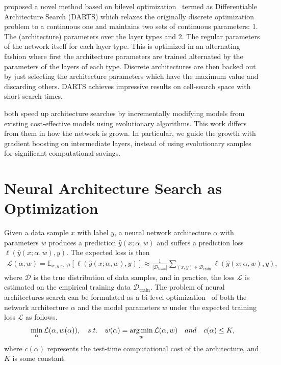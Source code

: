 \cite{Liu2018DARTSDA} proposed a novel method based on bilevel
optimization~\citep{bilevel_opt} termed as Differentiable Architecture
Search (DARTS) which relaxes the originally discrete optimization
problem to a continuous one and maintains two sets of continuous
parameters: 1. The (architecture) parameters over the layer types and
2. The regular parameters of the network itself for each layer
type. This is optimized in an alternating fashion where first the
architecture parameters are trained alternated by the parameters of
the layers of each type. Discrete architectures are then backed out by
just selecting the architecture parameters which have the maximum
value and discarding others. DARTS achieves impressive results on
cell-search space with short search times.

\cite{Elsken2018EfficientMN, CaiPathLevel} both speed up architecture
searches by incrementally modifying models from existing
cost-effective models using evolutionary algorithms.  This work
differs from them in how the network is grown. In particular, we guide
the growth with gradient boosting on intermediate layers, instead of
using evolutionary samples for significant computational
savings.

\section{Neural Architecture Search as Optimization}
\label{sec:nas_bi_level_optimization}

Given a data sample $x$ with label $y$, a neural network architecture $\alpha$ with parameters $w$ produces 
a prediction $\hat{y}(x ; \alpha, w)$ and suffers a prediction loss $\ell(\hat{y}(x ; \alpha, w), y)$.
The expected loss is then 
\begin{align}
\mathcal{L}(\alpha, w) = \mathbb{E} _{x, y \sim \mathcal{D}} [ \ell(\hat{y}(x ; \alpha, w), y) ] 
\approx \frac{1}{|\mathcal{D}_\textrm{train}|}
   \sum _{(x, y) \in \mathcal{D}_\textrm{train}} \ell(\hat{y}(x ; \alpha, w), y) ,
\end{align}
where $\mathcal{D}$ is the true distribution of data samples, and in practice,
the loss $\mathcal{L}$ is estimated on the empirical training data $\mathcal{D}_\textrm{train}$. 
The problem of neural architectures search can be formulated as a bi-level optimization~\citep{bilevel_opt}
of both the network architecture $\alpha$ and the model parameters $w$ under the expected training loss $\mathcal{L}$ 
as follows.
\begin{align}
\min _{\alpha} \mathcal{L} (\alpha, w(\alpha)),
\quad
s.t. \quad w(\alpha) = \operatorname*{arg\,min} _w \mathcal{L} (\alpha, w) 
\quad and \quad c(\alpha) \leq K,
\label{eq:bilevel_nas}
\end{align}
where $c(\alpha)$ represents the test-time computational cost of the architecture, and $K$ is some constant. 

